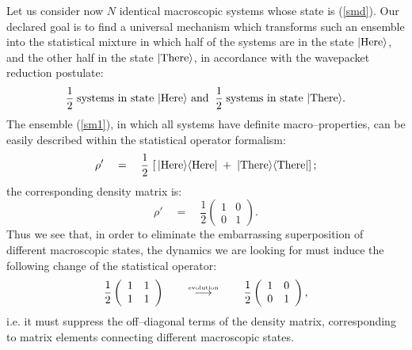 \documentclass[10pt,a4paper]{article}
\begin{document}
Let us consider now $N$ identical macroscopic systems whose state
is (\ref{smd}). Our declared goal is to find a universal mechanism
which transforms such an ensemble into the statistical mixture in
which half of the systems are in the state
$|\makebox{Here}\rangle$, and the other half in the state
$|\makebox{There}\rangle$, in accordance with the wavepacket
reduction postulate:
\begin{equation} \label{sm1}
\frac{1}{2}\;\makebox{systems in state $|\makebox{Here}\rangle$
and}\;\; \frac{1}{2}\;\makebox{systems in state
$|\makebox{There}\rangle$}.
\end{equation}
The ensemble (\ref{sm1}), in which all systems have definite
macro--properties, can be easily described within the statistical
operator formalism:
\begin{equation} \label{sop}
\rho' \quad = \quad \frac{1}{2}\,\left[\,
|\makebox{Here}\rangle\langle\makebox{Here}| \; + \;
|\makebox{There}\rangle\langle\makebox{There}| \right];
\end{equation}
the corresponding density matrix is:
\begin{equation} \label{ppp}
\rho' \quad = \quad \frac{1}{2} \left(
\begin{array}{cc}
1 & 0 \\ 0 & 1
\end{array}
\right).
\end{equation}
Thus we see that, in order to eliminate the embarrassing
superposition of different macroscopic states, the dynamics we are
looking for must induce the following change of the statistical
operator:
\begin{equation} \label{deso}
\frac{1}{2} \left(
\begin{array}{cc}
1 & 1 \\ 1 & 1
\end{array}
\right) \qquad \stackrel{\makebox{\tiny
evolution}}{\longrightarrow} \qquad \frac{1}{2} \left(
\begin{array}{cc}
1 & 0 \\ 0 & 1
\end{array}
\right),
\end{equation}
i.e. it must suppress the off--diagonal terms of the density
matrix, corresponding to  matrix elements connecting different
macroscopic states.
\end{document}
